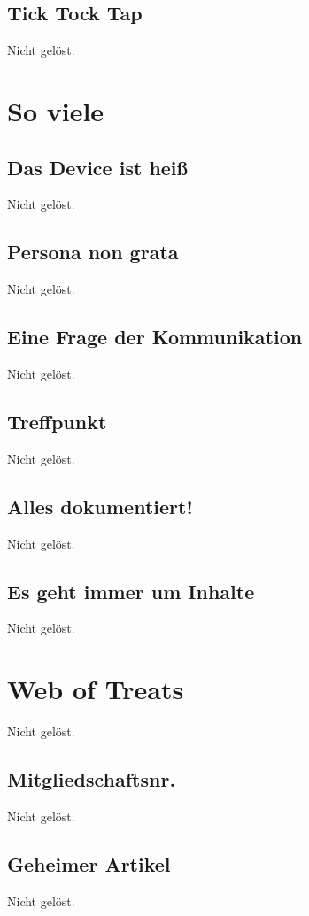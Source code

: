 \documentclass[12pt, a4paper, titlepage, oneside]{scrartcl}
\begin{document}
	\subsection{Tick Tock Tap}
	Nicht gelöst.

	\section{So viele}

	\subsection{Das Device ist heiß}
	Nicht gelöst.

	\subsection{Persona non grata}
	Nicht gelöst.

	\subsection{Eine Frage der Kommunikation}
	Nicht gelöst.

	\subsection{Treffpunkt}
	Nicht gelöst.

	\subsection{Alles dokumentiert!}
	Nicht gelöst.

	\subsection{Es geht immer um Inhalte}
	Nicht gelöst.

	\section{Web of Treats}
	Nicht gelöst.

	\subsection{Mitgliedschaftsnr.}
	Nicht gelöst.

	\subsection{Geheimer Artikel}
	Nicht gelöst.
\end{document}
